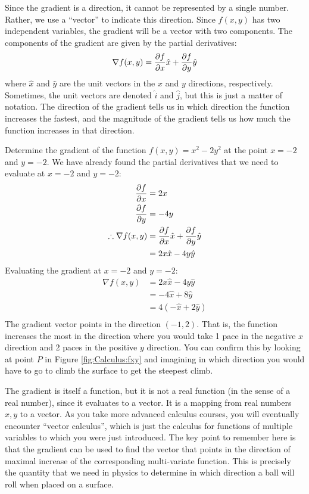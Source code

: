 Since the gradient is a direction, it cannot be represented by a single number. Rather, we use a ``vector'' to indicate this direction. Since $f(x,y)$ has two independent variables, the gradient will be a vector with two components. The components of the gradient are given by the partial derivatives:
\begin{align*}
\nabla f(x,y) = \frac{\partial f}{\partial x}\hat x+\frac{\partial f}{\partial y} \hat y
\end{align*}
where $\hat x$ and $\hat y$ are the unit vectors in the $x$ and $y$ directions, respectively. Sometimes, the unit vectors are denoted $\hat i$ and $\hat j$, but this is just a matter of notation. The direction of the gradient tells us in which direction the function increases the fastest, and the magnitude of the gradient tells us how much the function increases in that direction.

\begin{example}{Determine the gradient of the function $f(x,y)=x^2-2y^2$ at the point $x=-2$ and $y=-2$.}
We have already found the partial derivatives that we need to evaluate at $x=-2$ and $y=-2$:
\begin{align*}
\frac{\partial f}{\partial x}&= 2x\\
\frac{\partial f}{\partial y}&= -4y \\
\therefore \nabla f(x,y) &= \frac{\partial f}{\partial x}\hat x+\frac{\partial f}{\partial y} \hat y \\
&=2x\hat x-4y\hat y
\end{align*}
Evaluating the gradient at $x=-2$ and $y=-2$:
\begin{align*}
\nabla f(x,y) &= 2x\hat x-4y\hat y\\
&=-4 \hat x + 8 \hat y\\
&=4 (-\hat x+2\hat y)\\
\end{align*}
The gradient vector points in the direction $(-1,2)$. That is, the function increases the most in the direction where you would take 1 pace in the negative $x$ direction and 2 paces in the positive $y$ direction. You can confirm this by looking at point $P$ in Figure \ref{fig:Calculus:fxy} and imagining in which direction you would have to go to climb the surface to get the steepest climb.
\end{example}

The gradient is itself a function, but it is not a real function (in the sense of a real number), since it evaluates to a vector. It is a mapping from real numbers $x,y$ to a vector. As you take more advanced calculus courses, you will eventually encounter ``vector calculus'', which is just the calculus for functions of multiple variables to which you were just introduced. The key point to remember here is that the gradient can be used to find the vector that points in the direction of maximal increase of the corresponding multi-variate function. This is precisely the quantity that we need in physics to determine in which direction a ball will roll when placed on a surface.


